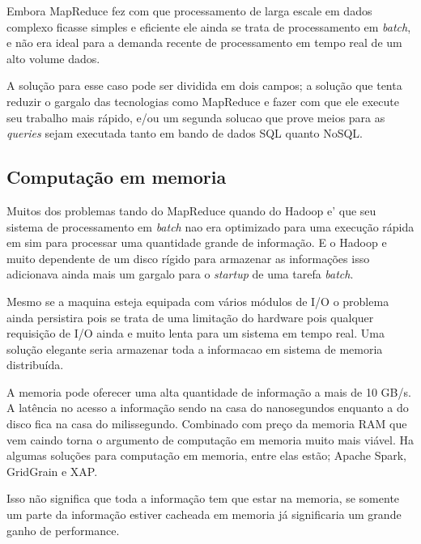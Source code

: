 Embora MapReduce fez com que processamento de larga escale em dados complexo ficasse simples e eficiente ele ainda se trata de processamento em \textit{batch}, e não era ideal para a demanda recente de processamento em tempo real de um alto volume dados.

A solução para esse caso pode ser dividida em dois campos; a solução que tenta reduzir o gargalo das tecnologias como MapReduce e fazer com que ele execute seu trabalho mais rápido, e/ou um segunda solucao que prove meios para as \textit{queries} sejam executada tanto em bando de dados SQL quanto NoSQL.

\subsection{Computação em memoria}

Muitos dos problemas tando do MapReduce quando do Hadoop e' que seu sistema de processamento em \textit{batch} nao era optimizado para uma execução rápida em sim para processar uma quantidade grande de informação. E o Hadoop e muito dependente de um disco rígido para armazenar as informações isso adicionava ainda mais um gargalo para o \textit{startup} de uma tarefa \textit{batch}.

Mesmo se a maquina esteja equipada com vários módulos de I/O o problema ainda persistira pois se trata de uma limitação do hardware pois qualquer requisição de I/O ainda e muito lenta para um sistema em tempo real. Uma solução elegante seria armazenar toda a informacao em sistema de memoria distribuída.

A memoria pode oferecer uma alta quantidade de informação a mais de 10 GB/s. A latência no acesso a informação sendo na casa do nanosegundos enquanto a do disco fica na casa do milissegundo. Combinado com preço da memoria RAM que vem caindo torna o argumento de computação em memoria muito mais viável. Ha algumas soluções para computação em memoria, entre elas estão; Apache Spark, GridGrain e XAP.

Isso não significa que toda a informação tem que estar na memoria, se somente um parte da informação estiver cacheada em memoria já significaria um grande ganho de performance.






 
